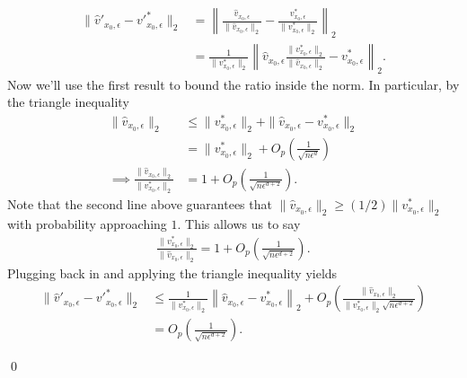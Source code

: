 \documentclass[11pt]{article}
\begin{document}
\begin{appendices}
\begin{align*}
    \|\hat{v}'_{x_0, \epsilon} - v'^*_{x_0, \epsilon}\|_2 &= \left\|\frac{\hat{v}_{x_0, \epsilon}}{\|\hat{v}_{x_0, \epsilon}\|_2} - \frac{v^*_{x_0, \epsilon}}{\|v^*_{x_0, \epsilon}\|_2}\right\|_2 \\
    &= \frac{1}{\|v^*_{x_0, \epsilon}\|_2}\left\|\hat{v}_{x_0, \epsilon}\frac{\|v^*_{x_0, \epsilon}\|_2}{\|\hat{v}_{x_0, \epsilon}\|_2} - v^*_{x_0, \epsilon}\right\|_2.
\end{align*}
Now we'll use the first result to bound the ratio inside the norm. In particular, by the triangle inequality
\begin{align*} 
    \|\hat{v}_{x_0, \epsilon}\|_2  &\leq \|v^*_{x_0, \epsilon}\|_2 + \|\hat{v}_{x_0, \epsilon} - v^*_{x_0, \epsilon}\|_2 \\
    &= \|v^*_{x_0, \epsilon}\|_2 + O_p\left(\frac{1}{\sqrt{n\epsilon^d}}\right) \\
    \implies \frac{\|\hat{v}_{x_0, \epsilon}\|_2}{\|v^*_{x_0, \epsilon}\|_2} &= 1 + O_p\left(\frac{1}{\sqrt{n\epsilon^{d+2}}}\right). 
\end{align*}
Note that the second line above guarantees that $\|\hat{v}_{x_0, \epsilon}\|_2 \geq (1/2)\|v^*_{x_0, \epsilon}\|_2$ with probability approaching $1$. This allows us to say
\begin{align}
    \frac{\|v^*_{x_0, \epsilon}\|_2}{\|\hat{v}_{x_0, \epsilon}\|_2} = 1 + O_p\left(\frac{1}{\sqrt{n\epsilon^{d+2}}}\right). \label{eq: velocity norm ratio}
\end{align}
Plugging back in and applying the triangle inequality yields
\begin{align*}
    \|\hat{v}'_{x_0, \epsilon} - v'^*_{x_0, \epsilon}\|_2     &\leq \frac{1}{\|v^*_{x_0, \epsilon}\|_2}\left\|\hat{v}_{x_0, \epsilon} - v^*_{x_0, \epsilon} \right\|_2 + O_p\left(\frac{\|\hat{v}_{x_0, \epsilon}\|_2}{\|v^*_{x_0, \epsilon}\|_2\sqrt{n\epsilon^{d+2}}}\right) \\
    &= O_p\left(\frac{1}{\sqrt{n\epsilon^{d+2}}}\right) .
\end{align*}

\qed{}



\end{appendices}
\end{document}
